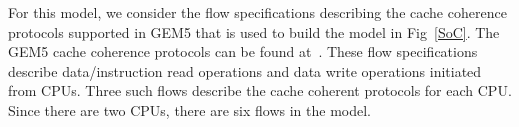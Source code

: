 \documentclass[conference]{IEEEtran}
\begin{document}



For this model, we consider the flow specifications
describing the cache coherence protocols supported in
GEM5 that is used to build the model in Fig~\ref{SoC}.
The GEM5 cache coherence protocols can be found at~\cite{gem5}.
These flow specifications describe data/instruction read
operations and data write operations initiated from CPUs.
Three such flows describe the cache coherent protocols for
each CPU.  Since there are two CPUs, there are six flows in
the model.

\end{document}

